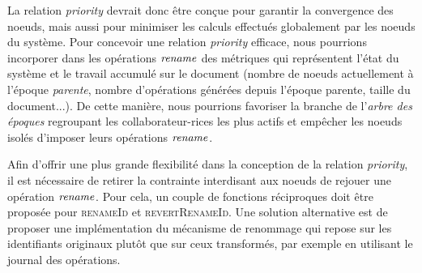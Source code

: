 La relation \emph{priority} devrait donc être conçue pour garantir la convergence des noeuds, mais aussi pour minimiser les calculs effectués globalement par les noeuds du système.
Pour concevoir une relation \emph{priority} efficace, nous pourrions incorporer dans les opérations $\mathit{rename}$ des métriques qui représentent l'état du système et le travail accumulé sur le document (nombre de noeuds actuellement à l'époque \emph{parente}, nombre d'opérations générées depuis l'époque parente, taille du document...).
De cette manière, nous pourrions favoriser la branche de l'\emph{arbre des époques} regroupant les collaborateur-rices les plus actifs et empêcher les noeuds isolés d'imposer leurs opérations $\mathit{rename}$.

Afin d'offrir une plus grande flexibilité dans la conception de la relation \emph{priority}, il est nécessaire de retirer la contrainte interdisant aux noeuds de rejouer une opération $\mathit{rename}$.
Pour cela, un couple de fonctions réciproques doit être proposée pour \textsc{renameId} et \textsc{revertRenameId}.
Une solution alternative est de proposer une implémentation du mécanisme de renommage qui repose sur les identifiants originaux plutôt que sur ceux transformés, par exemple en utilisant le journal des opérations.
